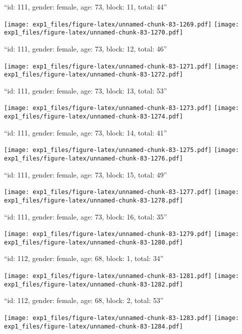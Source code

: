 \documentclass[11pt,,]{article}
\begin{document}
\newpage
[1] 

``id: 111, gender: female, age: 73, block: 11, total: 44''

\texttt{[image: exp1\_files/figure-latex/unnamed-chunk-83-1269.pdf]}
\texttt{[image: exp1\_files/figure-latex/unnamed-chunk-83-1270.pdf]}

\newpage
[1] 

``id: 111, gender: female, age: 73, block: 12, total: 46''

\texttt{[image: exp1\_files/figure-latex/unnamed-chunk-83-1271.pdf]}
\texttt{[image: exp1\_files/figure-latex/unnamed-chunk-83-1272.pdf]}

\newpage
[1] 

``id: 111, gender: female, age: 73, block: 13, total: 53''

\texttt{[image: exp1\_files/figure-latex/unnamed-chunk-83-1273.pdf]}
\texttt{[image: exp1\_files/figure-latex/unnamed-chunk-83-1274.pdf]}

\newpage
[1] 

``id: 111, gender: female, age: 73, block: 14, total: 41''

\texttt{[image: exp1\_files/figure-latex/unnamed-chunk-83-1275.pdf]}
\texttt{[image: exp1\_files/figure-latex/unnamed-chunk-83-1276.pdf]}

\newpage
[1] 

``id: 111, gender: female, age: 73, block: 15, total: 49''

\texttt{[image: exp1\_files/figure-latex/unnamed-chunk-83-1277.pdf]}
\texttt{[image: exp1\_files/figure-latex/unnamed-chunk-83-1278.pdf]}

\newpage
[1] 

``id: 111, gender: female, age: 73, block: 16, total: 35''

\texttt{[image: exp1\_files/figure-latex/unnamed-chunk-83-1279.pdf]}
\texttt{[image: exp1\_files/figure-latex/unnamed-chunk-83-1280.pdf]}

\newpage
[1] 

``id: 112, gender: female, age: 68, block: 1, total: 34''

\texttt{[image: exp1\_files/figure-latex/unnamed-chunk-83-1281.pdf]}
\texttt{[image: exp1\_files/figure-latex/unnamed-chunk-83-1282.pdf]}

\newpage
[1] 

``id: 112, gender: female, age: 68, block: 2, total: 53''

\texttt{[image: exp1\_files/figure-latex/unnamed-chunk-83-1283.pdf]}
\texttt{[image: exp1\_files/figure-latex/unnamed-chunk-83-1284.pdf]}
\end{document}
